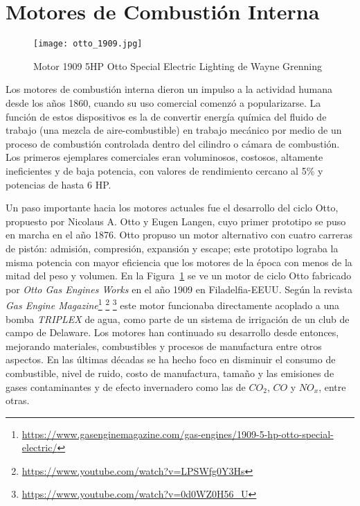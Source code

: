 \section{Motores de Combustión Interna}

\begin{figure}
  \centering
  \texttt{[image: otto\_1909.jpg]}
  \caption{Motor 1909 5HP Otto Special Electric Lighting de Wayne Grenning}\label{fig:otto1909}
\end{figure}

Los motores de combustión interna dieron un impulso a la actividad humana desde
los años 1860, cuando su uso comercial comenzó a popularizarse.
%
La función de estos dispositivos es la de convertir energía química del fluido
de trabajo (una mezcla de aire-combustible) en trabajo mecánico por medio de un
proceso de combustión controlada dentro del cilindro o cámara de combustión.
%
Los primeros ejemplares comerciales eran voluminosos, costosos, altamente
ineficientes y de baja potencia, con valores de rendimiento cercano al 5\% y
potencias de hasta 6 HP.

Un paso importante hacia los motores actuales fue el desarrollo del ciclo Otto,
propuesto por Nicolaus A. Otto y Eugen Langen, cuyo primer prototipo se puso en
marcha en el año 1876.
%
Otto propuso un motor alternativo con cuatro carreras de pistón: admisión,
compresión, expansión y escape; este prototipo lograba la misma potencia con
mayor eficiencia que los motores de la época con menos de la mitad del peso y
volumen.
%
En la Figura~\ref{fig:otto1909} se ve un motor de ciclo Otto fabricado por
\emph{Otto Gas Engines Works} en el año 1909 en Filadelfia-EEUU.
%
Según la revista \emph{Gas Engine
Magazine}\footnote{\url{https://www.gasenginemagazine.com/gas-engines/1909-5-hp-otto-special-electric/}}
\footnote{ \url{https://www.youtube.com/watch?v=LPSWfg0Y3Hs} } \footnote{
\url{https://www.youtube.com/watch?v=0d0WZ0H56_U} } este motor funcionaba
directamente acoplado a una bomba \emph{TRIPLEX} de agua, como parte de un
sistema de irrigación de un club de campo de Delaware.
%
Los motores han continuado su desarrollo desde entonces, mejorando materiales,
combustibles y procesos de manufactura entre otros aspectos.
%
En las últimas décadas se ha hecho foco en disminuir el consumo de combustible,
nivel de ruido, costo de manufactura, tamaño y las emisiones de gases
contaminantes y de efecto invernadero como las de $CO_2$, $CO$ y $NO_x$, entre
otras.


